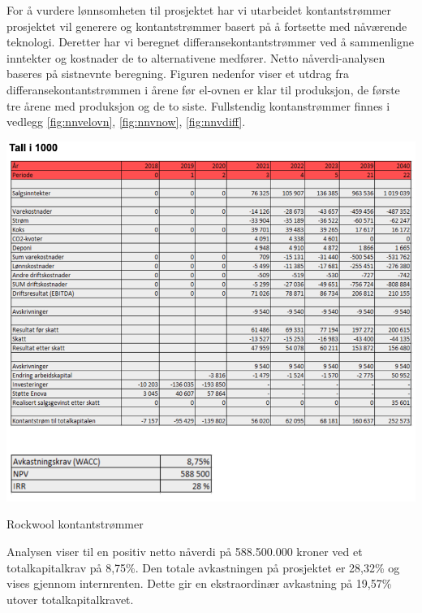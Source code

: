 For å vurdere lønnsomheten til prosjektet har vi utarbeidet kontantstrømmer prosjektet vil generere og kontantstrømmer basert på å fortsette med nåværende teknologi. Deretter har vi beregnet differansekontantstrømmer ved å sammenligne inntekter og kostnader de to alternativene medfører. Netto nåverdi-analysen baseres på sistnevnte beregning. Figuren nedenfor viser et utdrag fra differansekontantstrømmen i årene før el-ovnen er klar til produksjon, de første tre årene med produksjon og de to siste. Fullstendig kontanstrømmer finnes i vedlegg \ref{fig:nnvelovn}, \ref{fig:nnvnow}, \ref{fig:nnvdiff}.

\begin{table}[H]
  \includegraphics[width=\linewidth]{tabeller/lonnsomhet.png}
  \caption{Rockwool kontantstrømmer}
  \label{tbl:lonnsomhet}
\end{table}

Analysen viser til en positiv netto nåverdi på 588.500.000 kroner ved et totalkapitalkrav på 8,75\%. Den totale avkastningen på prosjektet er 28,32\% og vises gjennom internrenten. Dette gir en ekstraordinær avkastning på 19,57\% utover totalkapitalkravet.